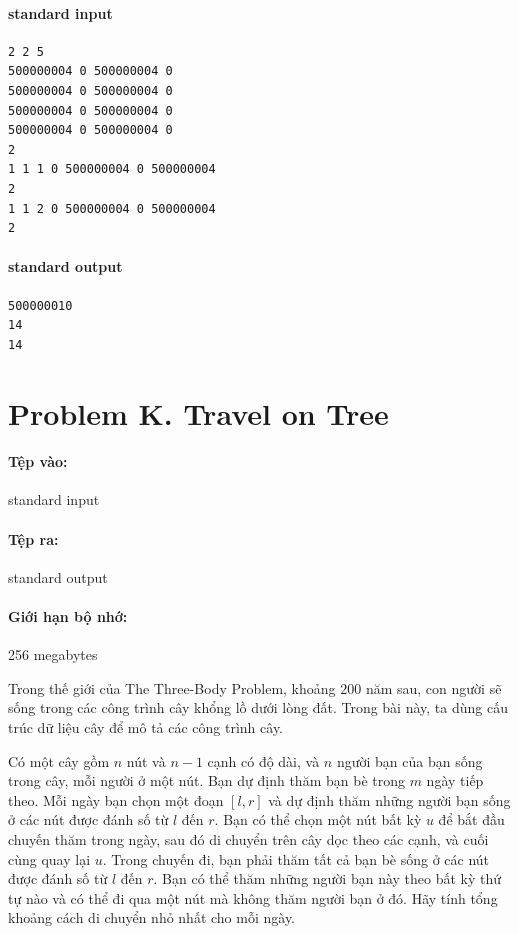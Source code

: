\documentclass[11pt]{article}
\begin{document}
\paragraph{standard input}
\begin{verbatim}
2 2 5
500000004 0 500000004 0
500000004 0 500000004 0
500000004 0 500000004 0
500000004 0 500000004 0
2
1 1 1 0 500000004 0 500000004
2
1 1 2 0 500000004 0 500000004
2
\end{verbatim}

\paragraph{standard output}
\begin{verbatim}
500000010
14
14
\end{verbatim}

\section{Problem K. Travel on Tree}

\paragraph{Tệp vào:} standard input
\paragraph{Tệp ra:} standard output
\paragraph{Giới hạn bộ nhớ:} 256 megabytes

Trong thế giới của The Three-Body Problem, khoảng \(200\) năm sau, con người
sẽ sống trong các công trình cây khổng lồ dưới lòng đất. Trong bài này, ta
dùng cấu trúc dữ liệu cây để mô tả các công trình cây.

Có một cây gồm \(n\) nút và \(n-1\) cạnh có độ dài, và \(n\) người bạn của
bạn sống trong cây, mỗi người ở một nút. Bạn dự định thăm bạn bè trong
\(m\) ngày tiếp theo. Mỗi ngày bạn chọn một đoạn \([l,r]\) và dự định thăm
những người bạn sống ở các nút được đánh số từ \(l\) đến \(r\). Bạn có thể
chọn một nút bất kỳ \(u\) để bắt đầu chuyến thăm trong ngày, sau đó di chuyển
trên cây dọc theo các cạnh, và cuối cùng quay lại \(u\). Trong chuyến đi, bạn
phải thăm tất cả bạn bè sống ở các nút được đánh số từ \(l\) đến \(r\). Bạn
có thể thăm những người bạn này theo bất kỳ thứ tự nào và có thể đi qua một
nút mà không thăm người bạn ở đó. Hãy tính tổng khoảng cách di chuyển nhỏ
nhất cho mỗi ngày.
\end{document}
